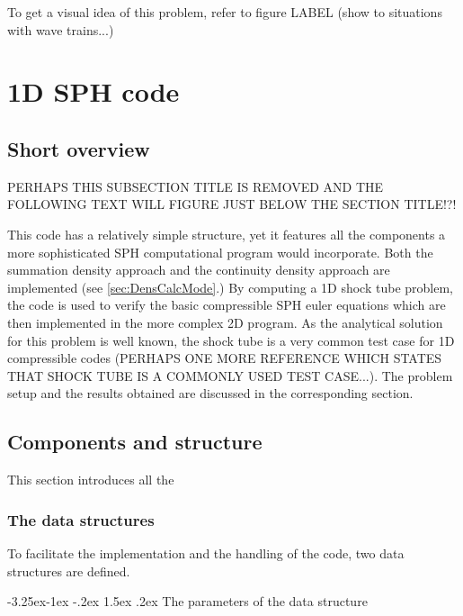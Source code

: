\documentclass{report}
\makeatletter
\renewcommand\paragraph{\@startsection{paragraph}{4}{\z@}%
  {-3.25ex\@plus -1ex \@minus -.2ex}%
  {1.5ex \@plus .2ex}%
  {\normalfont\normalsize\bfseries}}
\makeatother
\begin{document}
To get a visual idea of this problem, refer to figure LABEL (show to situations with wave trains...)

 









\section{1D SPH code}
\label{sec:1DSPHcode}

\subsection{Short overview}
PERHAPS THIS SUBSECTION TITLE IS REMOVED AND THE FOLLOWING TEXT WILL FIGURE JUST BELOW THE SECTION TITLE!?!

This code has a relatively simple structure, yet it features all the components
a more sophisticated SPH computational program would incorporate. Both the summation 
density approach and the continuity density approach are implemented (see 
\ref{sec:DensCalcMode}.) By computing a 1D shock tube problem, the code is used to verify 
the basic compressible SPH euler equations which are then implemented in the more complex 2D program. 
As the analytical solution for this problem is well known, the shock tube is a very 
common test case for 1D compressible codes \cite{Sod1978} (PERHAPS ONE MORE REFERENCE WHICH STATES THAT SHOCK TUBE IS A COMMONLY USED TEST CASE...). 
The problem setup and the results obtained are discussed in the corresponding section.

\subsection{Components and structure}
This section introduces all the

\subsubsection{The data structures}

To facilitate the implementation and the handling of the code, two data structures are defined. 

\paragraph{The parameters of the data structure}
\end{document}
